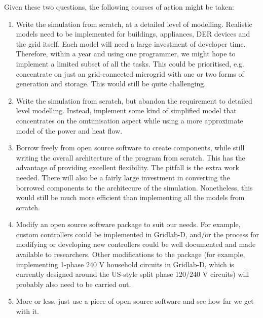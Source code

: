\documentclass[12pt]{article}
\begin{document}
Given these two questions, the following courses of action might be taken:

\begin{enumerate}

\item Write the simulation from scratch, at a detailed level of modelling. Realistic models need to be implemented for buildings, appliances, DER devices and the grid itself. Each model will need a large investment of developer time.  Therefore, within a year and using one programmer, we might hope to implement a limited subset of all the tasks. This could be prioritised, e.g. concentrate on just an grid-connected microgrid with one or two forms of generation and storage. This would still be quite challenging.  
\item Write the simulation from scratch, but abandon the requirement to detailed level modelling. Instead, implement some kind of simplified model that concentrates on the omtimisation aspect while using a more approximate model of the power and heat flow.  
\item Borrow freely from open source software to create components, while still writing the overall architecture of the program from scratch. This has the advantage of providing excellent flexibility. The pitfall is the extra work needed.  There will also be a fairly large investment in converting the borrowed components to the architecure of the simulation.  Nonetheless, this would still be much more efficient than implementing all the models from scratch.
\item Modify an open source software package to suit our needs. For example, custom controllers could be implemented in Gridlab-D, and/or the process for modifying or developing new controllers could be well documented and made available to researchers. Other modifications to the package (for example, implementing 1-phase 240 V household circuits in Gridlab-D, which is currently designed around the US-style split phase 120/240 V circuits) will probably also need to be carried out.  
\item More or less, just use a piece of open source software and see how far we get with it.  
\end{enumerate}
\end{document}

